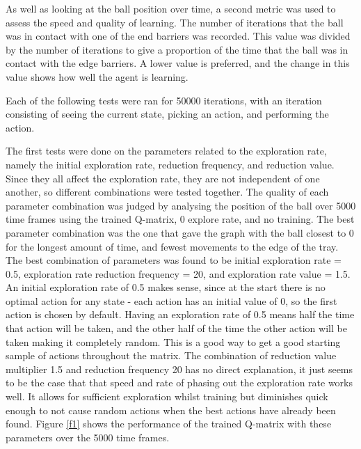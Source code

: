 \documentclass[12pt,a4paper]{article}
\begin{document}
As well as looking at the ball position over time, a second metric was used to assess the speed and quality of learning. The number of iterations that the ball was in contact with one of the end barriers was recorded. This value was divided by the number of iterations to give a proportion of the time that the ball was in contact with the edge barriers. A lower value is preferred, and the change in this value shows how well the agent is learning. 

Each of the following tests were ran for 50000 iterations, with an iteration consisting of seeing the current state, picking an action, and performing the action.

The first tests were done on the parameters related to the exploration rate, namely the initial exploration rate, reduction frequency, and reduction value. Since they all affect the exploration rate, they are not independent of one another, so different combinations were tested together. The quality of each parameter combination was judged by analysing the position of the ball over 5000 time frames using the trained Q-matrix, 0 explore rate, and no training. The best parameter combination was the one that gave the graph with the ball closest to 0 for the longest amount of time, and fewest movements to the edge of the tray. The best combination of parameters was found to be initial exploration rate = 0.5, exploration rate reduction frequency = 20, and exploration rate value = 1.5. An initial exploration rate of 0.5 makes sense, since at the start there is no optimal action for any state - each action has an initial value of 0, so the first action is chosen by default. Having an exploration rate of 0.5 means half the time that action will be taken, and the other half of the time the other action will be taken making it completely random. This is a good way to get a good starting sample of actions throughout the matrix. The combination of reduction value multiplier 1.5 and reduction frequency 20 has no direct explanation, it just seems to be the case that that speed and rate of phasing out the exploration rate works well. It allows for sufficient exploration whilst training but diminishes quick enough to not cause random actions when the best actions have already been found. Figure \ref{f1} shows the performance of the trained Q-matrix with these parameters over the 5000 time frames.
\end{document}
